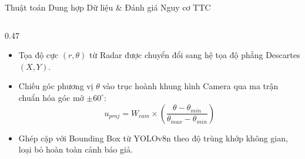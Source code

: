 \documentclass[aspectratio=169, 11pt]{beamer}
\begin{document}
\begin{frame}{Thuật toán Dung hợp Dữ liệu \& Đánh giá Nguy cơ TTC}
\begin{columns}[T, onlytextwidth]
    \begin{column}{0.47\textwidth}
      \par
      \vspace{0.08cm}
      \begin{tcolorbox}[
        enhanced, colback=white, colframe=DarkMain, boxrule=0.9pt, arc=3.2pt,
        top=3pt, bottom=3pt, left=5pt, right=5pt
      ]
        {\fontsize{7.2pt}{9.0pt}\selectfont
        \begin{itemize}
          \item Tọa độ cực $(r, \theta)$ từ Radar được chuyển đổi sang hệ tọa độ phẳng Descartes $(X, Y)$.
          \item Chiếu góc phương vị $\theta$ vào trục hoành khung hình Camera qua ma trận chuẩn hóa góc mở $\pm 60^\circ$:
          \begin{equation*}
            u_{proj} = W_{cam} \times \left( \frac{\theta - \theta_{min}}{\theta_{max} - \theta_{min}} \right)
          \end{equation*}
          \item Ghép cặp với Bounding Box từ YOLOv8n theo độ trùng khớp không gian, loại bỏ hoàn toàn cảnh báo giả.
        \end{itemize}}
      \end{tcolorbox}
    \end{column}
  \end{columns}
\end{frame}
\end{document}
